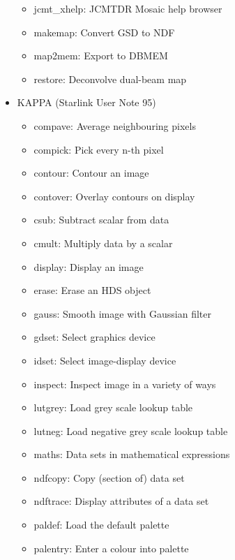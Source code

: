 \documentclass[11pt]{article}
\newcommand{\xref}[3]{#1}
\begin{document}
\begin{itemize}
\begin{itemize}
   \item \xref{jcmt\_xhelp}{sun132}{JCMT_XHELP}: JCMTDR Mosaic help browser
   \item \xref{makemap}{sun132}{MAKEMAP}: Convert GSD to NDF
   \item \xref{map2mem}{sun132}{MAP2MEM}: Export to DBMEM
   \item \xref{restore}{sun132}{RESTORE}: Deconvolve dual-beam map
   \end{itemize}
\item KAPPA \xref{(Starlink User Note 95)}{sun95}{}
   \begin{itemize}
   \item \xref{compave}{sun95}{COMPAVE}: Average neighbouring pixels
   \item \xref{compick}{sun95}{COMPICK}: Pick every n-th pixel
   \item \xref{contour}{sun95}{CONTOUR}: Contour an image
   \item \xref{contover}{sun95}{CONTOVER}: Overlay contours on display
   \item \xref{csub}{sun95}{CSUB}: Subtract scalar from data
   \item \xref{cmult}{sun95}{CMULT}: Multiply data by a scalar
   \item \xref{display}{sun95}{DISPLAY}: Display an image
   \item \xref{erase}{sun95}{ERASE}: Erase an HDS object
   \item \xref{gauss}{sun95}{GAUSMOOTH}: Smooth image with Gaussian filter
   \item \xref{gdset}{sun95}{GDSET}: Select graphics device
   \item \xref{idset}{sun95}{IDSET}: Select image-display device
   \item \xref{inspect}{sun95}{INSPECT}: Inspect image in a variety of ways
   \item \xref{lutgrey}{sun95}{LUTGREY}: Load grey scale lookup table
   \item \xref{lutneg}{sun95}{LUTNEG}: Load negative grey scale lookup table
   \item \xref{maths}{sun95}{MATHS}: Data sets in mathematical expressions
   \item \xref{ndfcopy}{sun95}{NDFCOPY}: Copy (section of) data set
   \item \xref{ndftrace}{sun95}{NDFTRACE}: Display attributes of a data set
   \item \xref{paldef}{sun95}{PALDEF}: Load the default palette
   \item \xref{palentry}{sun95}{PALENTRY}: Enter a colour into palette

\end{itemize}
\end{itemize}
\end{document}
